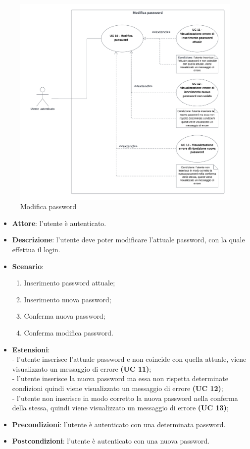 \begin{figure}[!h]
    \includegraphics[width=15cm]{sezioni/Images/UC10.png}
    \centering
    \caption{Modifica password}
\end{figure}

\begin{itemize}
    \item \textbf{Attore}: l'utente è autenticato.
    \item \textbf{Descrizione}: l'utente deve poter modificare l'attuale password, con la quale effettua il login.
    \item \textbf{Scenario}:
    \begin{enumerate}
        \item Inserimento password attuale;
        \item Inserimento nuova password;
        \item Conferma nuova password;
        \item Conferma modifica password.
    \end{enumerate}
    \item \textbf{Estensioni}:\\
        - l'utente inserisce l'attuale password e non coincide con quella attuale, viene visualizzato un messaggio di errore \textbf{(UC 11)};\\
        - l'utente inserisce la nuova password ma essa non rispetta determinate condizioni quindi viene visualizzato un messaggio di errore \textbf{(UC 12)};\\
        - l'utente non inserisce in modo corretto la nuova password nella conferma della stessa, quindi viene visualizzato un messaggio di errore \textbf{(UC 13)};\\

    \item \textbf{Precondizioni}: l'utente è autenticato con una determinata password.
    \item \textbf{Postcondizioni}: l'utente è autenticato con una nuova password.
\end{itemize}

